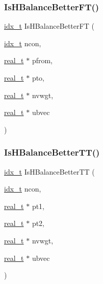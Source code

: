 \subsubsection{\texorpdfstring{Is\+H\+Balance\+Better\+F\+T()}{IsHBalanceBetterFT()}}
{\footnotesize\ttfamily \hyperlink{a00876_aaa5262be3e700770163401acb0150f52}{idx\+\_\+t} Is\+H\+Balance\+Better\+FT (\begin{DoxyParamCaption}\item[{\hyperlink{a00876_aaa5262be3e700770163401acb0150f52}{idx\+\_\+t}}]{ncon,  }\item[{\hyperlink{a00876_a1924a4f6907cc3833213aba1f07fcbe9}{real\+\_\+t} $\ast$}]{pfrom,  }\item[{\hyperlink{a00876_a1924a4f6907cc3833213aba1f07fcbe9}{real\+\_\+t} $\ast$}]{pto,  }\item[{\hyperlink{a00876_a1924a4f6907cc3833213aba1f07fcbe9}{real\+\_\+t} $\ast$}]{nvwgt,  }\item[{\hyperlink{a00876_a1924a4f6907cc3833213aba1f07fcbe9}{real\+\_\+t} $\ast$}]{ubvec }\end{DoxyParamCaption})}

\mbox{\label{a00873_adc07d03604c851e71cf29d34c6478c72}} 
\subsubsection{\texorpdfstring{Is\+H\+Balance\+Better\+T\+T()}{IsHBalanceBetterTT()}}
{\footnotesize\ttfamily \hyperlink{a00876_aaa5262be3e700770163401acb0150f52}{idx\+\_\+t} Is\+H\+Balance\+Better\+TT (\begin{DoxyParamCaption}\item[{\hyperlink{a00876_aaa5262be3e700770163401acb0150f52}{idx\+\_\+t}}]{ncon,  }\item[{\hyperlink{a00876_a1924a4f6907cc3833213aba1f07fcbe9}{real\+\_\+t} $\ast$}]{pt1,  }\item[{\hyperlink{a00876_a1924a4f6907cc3833213aba1f07fcbe9}{real\+\_\+t} $\ast$}]{pt2,  }\item[{\hyperlink{a00876_a1924a4f6907cc3833213aba1f07fcbe9}{real\+\_\+t} $\ast$}]{nvwgt,  }\item[{\hyperlink{a00876_a1924a4f6907cc3833213aba1f07fcbe9}{real\+\_\+t} $\ast$}]{ubvec }\end{DoxyParamCaption})}

